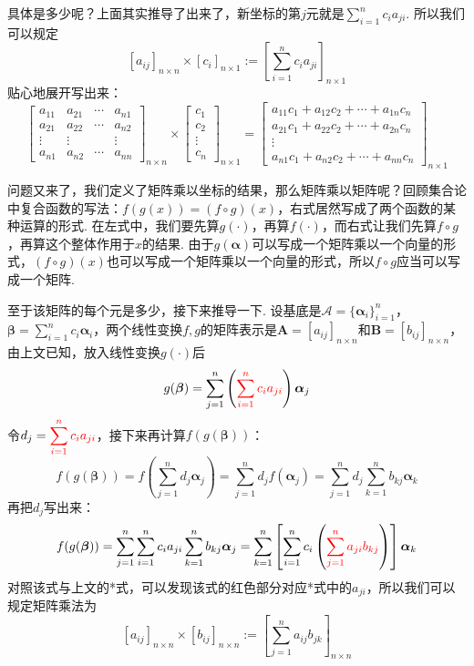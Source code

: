 \documentclass[main.tex]{subfiles}
\begin{document}
具体是多少呢？上面其实推导了出来了，新坐标的第\(j\)元就是\(\displaystyle{\sum_{i=1}^{n}c_i a_{ji}}\). 所以我们可以规定
\[[a_{ij}]_{n \times n} \times [c_i]_{n \times 1} := \left[ \sum_{i=1}^{n}c_i a_{ji} \right]_{n \times 1}\]
贴心地展开写出来：
\[
    \left[\begin{array}{cccc}
    a_{11} & a_{21} & \cdots & a_{n1} \\
    a_{21} & a_{22} & \cdots & a_{n2} \\
    \vdots & \vdots & & \vdots \\
    a_{n1} & a_{n2} & \cdots & a_{nn}
    \end{array}\right]_{n \times n}
    \times
    \begin{bmatrix}
        c_1 \\ c_2 \\ \vdots \\ c_n
    \end{bmatrix}_{n \times 1}
    =
    \begin{bmatrix}
        a_{11}c_1+a_{12}c_2+\cdots+a_{1n}c_n \\
        a_{21}c_1+a_{22}c_2+\cdots+a_{2n}c_n \\
        \vdots \\
        a_{n1}c_1+a_{n2}c_2+\cdots+a_{nn}c_n
    \end{bmatrix}_{n \times 1}
\]

问题又来了，我们定义了矩阵乘以坐标的结果，那么矩阵乘以矩阵呢？回顾集合论中复合函数的写法：\(f(g(x)) = (f \circ g)(x)\)，右式居然写成了两个函数的某种运算的形式. 在左式中，我们要先算\(g(\cdot)\)，再算\(f(\cdot)\)，而右式让我们先算\(f\circ g\)，再算这个整体作用于\(x\)的结果. 由于\(g(\bm\alpha)\)可以写成一个矩阵乘以一个向量的形式，\((f\circ g)(x)\)也可以写成一个矩阵乘以一个向量的形式，所以\(f\circ g\)应当可以写成一个矩阵.

至于该矩阵的每个元是多少，接下来推导一下. 设基底是\(\mathcal A = \{\bm\alpha_i\}_{i=1}^{n}\)，\(\displaystyle{\bm\beta = \sum_{i=1}^{n}c_i\bm\alpha_i}\)，两个线性变换\(f,g\)的矩阵表示是\(\bm A = [a_{ij}]_{n \times n}\)和\(\bm B = [b_{ij}]_{n \times n}\)，由上文已知，放入线性变换\(g(\cdot)\)后
\[g(\bm\beta) = \sum_{j=1}^{n} \left({\color{red}\sum_{i=1}^{n}c_i a_{ji}}\right)\bm\alpha_j\]
令\(\displaystyle{d_j = {\color{red}\sum_{i=1}^{n}c_i a_{ji}}}\)，接下来再计算\(f(g(\bm\beta))\)：
\[f(g(\bm\beta)) = f(\sum_{j=1}^{n} d_j\bm\alpha_j) = \sum_{j=1}^{n}d_jf(\bm\alpha_j) = \sum_{j=1}^{n}d_j\sum_{k=1}^{n}b_{kj}\bm\alpha_k\]
再把\(d_j\)写出来：
\[f(g(\bm\beta)) = \sum_{j=1}^{n} \sum_{i=1}^{n}c_i a_{ji}\sum_{k=1}^{n}b_{kj}\bm\alpha_j = \sum_{k=1}^{n}\left[\sum_{i=1}^{n}c_i\left({\color{red}\sum_{j=1}^{n}a_{ji}b_{kj}}\right)\right]\bm\alpha_k\]
对照该式与上文的*式，可以发现该式的红色部分对应*式中的\(a_{ji}\)，所以我们可以规定矩阵乘法为
\[[a_{ij}]_{n\times n} \times [b_{ij}]_{n \times n} := \left[\sum_{j=1}^{n}a_{ij}b_{jk}\right]_{n \times n}\]
\end{document}
